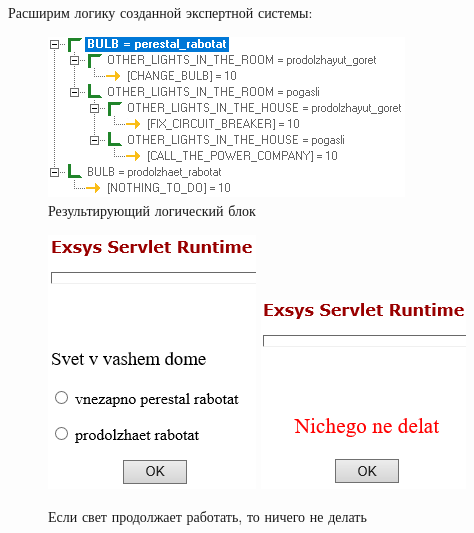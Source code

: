 \documentclass[14pt,a4paper,report]{report}
\begin{document}
Расширим логику созданной экспертной системы:

\begin{figure}[h!]
	\centering
	\includegraphics[scale = 0.85]{images/3_1.png}
	\caption{Результирующий логический блок}
\end{figure}

\begin{figure}[ht!]
	\includegraphics[width=.40\textwidth]{images/3_2.png}\hfill
	\includegraphics[width=.45\textwidth]{images/3_3.png}
	\caption{Если свет продолжает работать, то ничего не делать}
\end{figure}
\end{document}
